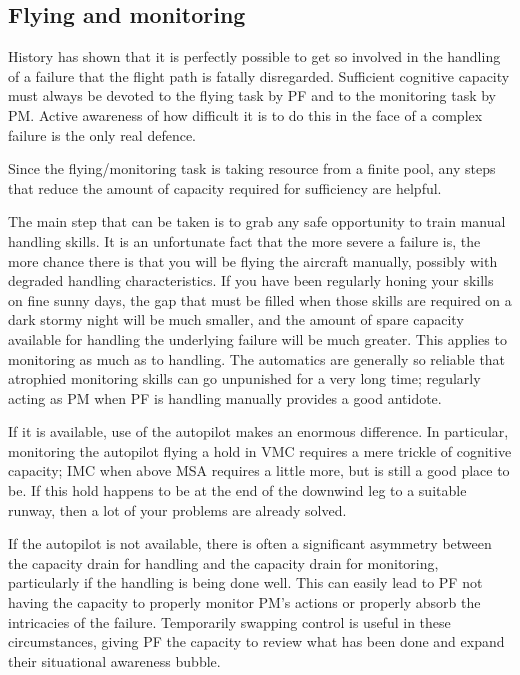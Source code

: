 \documentclass[a5paper,11pt,titlepage]{article}
\begin{document}
\subsection{Flying and monitoring}

History has shown that it is perfectly possible to get so involved in
the handling of a failure that the flight path is fatally
disregarded. Sufficient cognitive capacity must always be devoted to
the flying task by PF and to the monitoring task by PM. Active awareness
of how difficult it is to do this in the face of a complex failure is
the only real defence.

Since the flying/monitoring task is taking resource from a finite pool,
any steps that reduce the amount of capacity required for sufficiency
are helpful.

The main step that can be taken is to grab any safe opportunity to train
manual handling skills. It is an unfortunate fact that the more severe a
failure is, the more chance there is that you will be flying the
aircraft manually, possibly with degraded handling characteristics. If
you have been regularly honing your skills on fine sunny days, the gap
that must be filled when those skills are required on a dark stormy
night will be much smaller, and the amount of spare capacity available
for handling the underlying failure will be much greater. This applies
to monitoring as much as to handling. The automatics are generally so
reliable that atrophied monitoring skills can go unpunished for a very
long time; regularly acting as PM when PF is handling manually provides
a good antidote.

If it is available, use of the autopilot makes an enormous
difference. In particular, monitoring the autopilot flying a hold in VMC
requires a mere trickle of cognitive capacity; IMC when above MSA
requires a little more, but is still a good place to be. If this hold
happens to be at the end of the downwind leg to a suitable runway, then
a lot of your problems are already solved.

If the autopilot is not available, there is often a significant
asymmetry between the capacity drain for handling and the capacity drain
for monitoring, particularly if the handling is being done well. This
can easily lead to PF not having the capacity to properly monitor PM's
actions or properly absorb the intricacies of the failure. Temporarily
swapping control is useful in these circumstances, giving PF the
capacity to review what has been done and expand their situational
awareness bubble.
\end{document}
